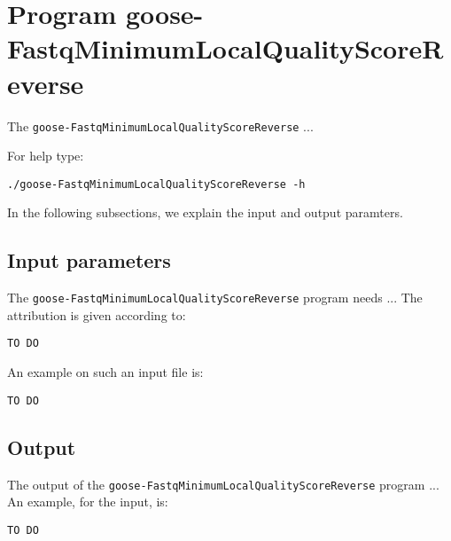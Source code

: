 \section{Program goose-FastqMinimumLocalQualityScoreReverse}
The \texttt{goose-FastqMinimumLocalQualityScoreReverse} ...

For help type:
\begin{lstlisting}
./goose-FastqMinimumLocalQualityScoreReverse -h
\end{lstlisting}
In the following subsections, we explain the input and output paramters.

\subsection{Input parameters}

The \texttt{goose-FastqMinimumLocalQualityScoreReverse} program needs ...
The attribution is given according to:
\begin{lstlisting}
TO DO
\end{lstlisting}

An example on such an input file is:
\begin{lstlisting}
TO DO
\end{lstlisting}

\subsection{Output}
The output of the \texttt{goose-FastqMinimumLocalQualityScoreReverse} program ...
An example, for the input, is:
\begin{lstlisting}
TO DO
\end{lstlisting}
